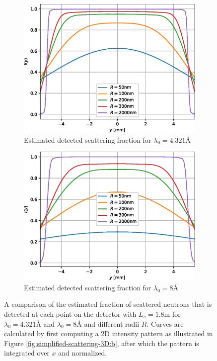 \documentclass{article}
\begin{document}
\begin{figure}[htbp]
	\centering
	\begin{subfigure}[b]{0.49\textwidth}
		\centering
		\includegraphics[width=\textwidth]{simplified-I-scattering-4.321}
		\caption{Estimated detected scattering fraction for $\lambda_0 = 4.321$Å}
		\label{fig:simplified-scattering-4.321}
	\end{subfigure}
	\hfill
	\begin{subfigure}[b]{0.49\textwidth}
		\centering
		\includegraphics[width=\textwidth]{simplified-I-scattering-8.0}
		\caption{Estimated detected scattering fraction for $\lambda_0 = 8$Å}
		\label{fig:simplified-scattering-8}
	\end{subfigure}
	\caption{A comparison of the estimated fraction of scattered neutrons that is detected at each point on the detector with $L_s = 1.8\unit\meter$ for $\lambda_0 = 4.321$Å and $\lambda_0 = 8$Å and different radii $R$. Curves are calculated by first computing a 2D intensity pattern as illustrated in Figure \ref{fig:simplified-scattering-3D:b}, after which the pattern is integrated over $x$ and normalized.} 
	\label{fig:simplified-scattering}
\end{figure}
\end{document}
